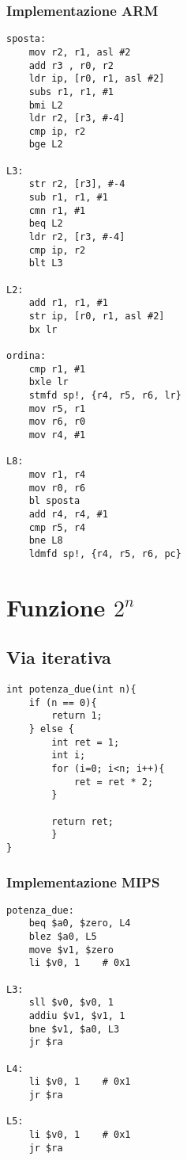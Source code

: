 \documentclass[class=book, crop=false, oneside]{standalone}
\begin{document}
\subsubsection{Implementazione ARM}
\begin{verbatim}
sposta:
	mov r2, r1, asl #2
	add r3 , r0, r2
	ldr ip, [r0, r1, asl #2]
	subs r1, r1, #1
	bmi L2
	ldr r2, [r3, #-4]
	cmp ip, r2
	bge L2

L3:
	str r2, [r3], #-4
	sub r1, r1, #1
	cmn r1, #1
	beq L2
	ldr r2, [r3, #-4]
	cmp ip, r2
	blt L3

L2:
	add r1, r1, #1
	str ip, [r0, r1, asl #2]
	bx lr

ordina:
	cmp r1, #1
	bxle lr
	stmfd sp!, {r4, r5, r6, lr}
	mov r5, r1
	mov r6, r0
	mov r4, #1

L8:
	mov r1, r4
	mov r0, r6
	bl sposta
	add r4, r4, #1
	cmp r5, r4
	bne L8
	ldmfd sp!, {r4, r5, r6, pc}
\end{verbatim}

\section{Funzione \(2^{n}\)}

\subsection*{Via iterativa}

\begin{verbatim}
int potenza_due(int n){
	if (n == 0){
		return 1;
	} else {
		int ret = 1;
		int i;
		for (i=0; i<n; i++){
			ret = ret * 2;
		}

		return ret;
		}
}
\end{verbatim}

\subsubsection{Implementazione MIPS}

\begin{verbatim}
potenza_due:
	beq $a0, $zero, L4
	blez $a0, L5
	move $v1, $zero
	li $v0, 1	 # 0x1

L3:
	sll $v0, $v0, 1
	addiu $v1, $v1, 1
	bne $v1, $a0, L3
	jr $ra

L4:
	li $v0, 1	 # 0x1
	jr $ra

L5:
	li $v0, 1	 # 0x1
	jr $ra
\end{verbatim}
\end{document}
